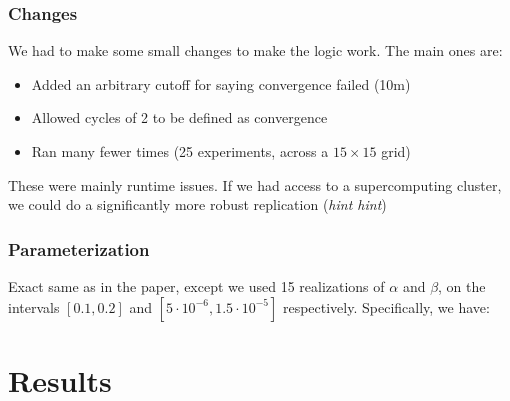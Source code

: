 \documentclass{beamer}
\begin{document}
\begin{frame}\frametitle{Changes}
	We had to make some small changes to make the logic work. The main ones are:
	\begin{itemize}
		\item Added an arbitrary cutoff for saying convergence failed (10m)
		\item Allowed cycles of 2 to be defined as convergence
		\item Ran many fewer times (25 experiments, across a $15 \times 15$ grid)
	\end{itemize}
	These were mainly runtime issues. If we had access to a supercomputing cluster, we could do a significantly more robust replication (\emph{hint hint})
\end{frame}

\begin{frame}\frametitle{Parameterization}
	Exact same as in the paper, except we used 15 realizations of $\alpha$ and $\beta$, on the intervals $[0.1,0.2]$ and $[5 \cdot 10^{-6},1.5 \cdot 10^{-5}]$ respectively. Specifically, we have:
	\begin{center}
	\end{center}
	
\end{frame}


\section{Results}
\end{document}
